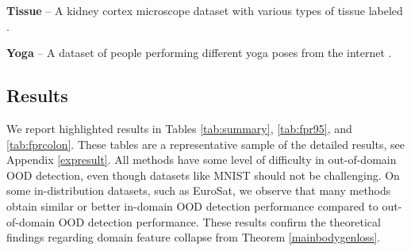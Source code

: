 \documentclass[letterpaper]{article} %
\theoremstyle{plain}
\theoremstyle{definition}
\theoremstyle{remark}
\begin{document}
\textbf{Tissue} – A kidney cortex microscope dataset with various types of tissue labeled \citep{yang2023medmnist}.

\textbf{Yoga} – A dataset of people performing different yoga poses from the internet \citep{yoga_data}.













\subsection{Results}

We report highlighted results in Tables \ref{tab:summary}, \ref{tab:fpr95}, and \ref{tab:fprcolon}. These tables are a representative sample of the detailed results, see Appendix \ref{expresult}. All methods have some level of difficulty in out-of-domain OOD detection, even though datasets like MNIST should not be challenging. On some in-distribution datasets, such as EuroSat, we observe that many methods obtain similar or better in-domain OOD detection performance compared to out-of-domain OOD detection performance. These results confirm the theoretical findings regarding domain feature collapse from Theorem \ref{mainbodygenloss}. 
\end{document}
